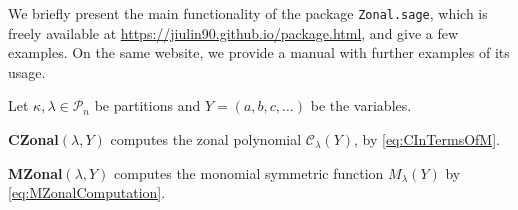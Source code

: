 \documentclass[smallextended]{svjour3}
\begin{document}
We briefly present the main functionality of the package \texttt{Zonal.sage},
which is freely available at \url{https://jiulin90.github.io/package.html},
and give a few examples. On the same website, we provide a
manual with further examples of its usage.

Let $\kappa, \lambda\in\mathcal{P}_n$ be partitions and $Y=(a, b, c, \ldots )$ be the variables.
\vspace{10bp}

\noindent \textbf{CZonal}$(\lambda, Y)$
computes the zonal polynomial $\mathcal{C}_{\lambda}(Y)$, by \eqref{eq:CInTermsOfM}.

\noindent{}



\vspace{5bp}

\noindent \textbf{MZonal}$(\lambda,Y)$
computes the monomial symmetric function $M_{\lambda}(Y)$ 
by \eqref{eq:MZonalComputation}.
\end{document}
